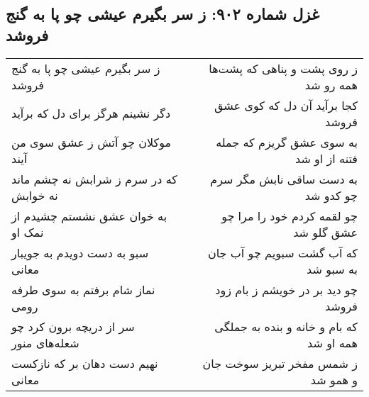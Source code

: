 \begin{center}
\section*{غزل شماره ۹۰۲: ز سر بگیرم عیشی چو پا به گنج فروشد}
\label{sec:0902}
\begin{longtable}{l p{0.5cm} r}
ز سر بگیرم عیشی چو پا به گنج فروشد
&&
ز روی پشت و پناهی که پشت‌ها همه رو شد
\\
دگر نشینم هرگز برای دل که برآید
&&
کجا برآید آن دل که کوی عشق فروشد
\\
موکلان چو آتش ز عشق سوی من آیند
&&
به سوی عشق گریزم که جمله فتنه از او شد
\\
که در سرم ز شرابش نه چشم ماند نه خوابش
&&
به دست ساقی نابش مگر سرم چو کدو شد
\\
به خوان عشق نشستم چشیدم از نمک او
&&
چو لقمه کردم خود را مرا چو عشق گلو شد
\\
سبو به دست دویدم به جویبار معانی
&&
که آب گشت سبویم چو آب جان به سبو شد
\\
نماز شام برفتم به سوی طرفه رومی
&&
چو دید بر در خویشم ز بام زود فروشد
\\
سر از دریچه برون کرد چو شعله‌های منور
&&
که بام و خانه و بنده به جملگی همه او شد
\\
نهیم دست دهان بر که نازکست معانی
&&
ز شمس مفخر تبریز سوخت جان و همو شد
\\
\end{longtable}
\end{center}
